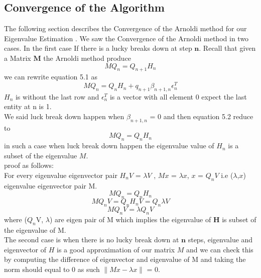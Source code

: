 \documentclass{article}
\numberwithin{equation}{section}
\begin{document}
\subsection{Convergence of the Algorithm} 
The following section describes the Convergence of the Arnoldi method for our Eigenvalue Estimation .
We saw the Convergence of the Arnoldi method in two cases.
In the first case If there is a lucky breaks down at step $\boldsymbol{n}$.
Recall that given a Matrix $\boldsymbol{M}$ the Arnoldi method produce 
\begin{equation}
     MQ_n = Q_{n+1}H_n 
\end{equation}
we can rewrite equation 5.1 as  
    \begin{equation}
     MQ_n = Q_nH_n +q_{n+1}\beta_{n+1,n} \epsilon_n^T   
\end{equation} ${H_n}$ is without the last row and ${\epsilon_n^T }$ is a vector with all element  0 expect the last entity at n is 1. \\
We said luck break down happen when ${\beta_{n+1,n}}$ = 0 and then equation 5.2 reduce to  
\begin{equation}
     MQ_n = Q_nH_n 
\end{equation} in such a case when luck break down happen the eigenvalue value of ${H_n}$ is a subset of the eigenvalue ${M}$.\\ proof as follows:\\
For every  eigenvalue eigenvector pair  ${H_n V}$ = ${\lambda V}$ , ${M x}$ = ${\lambda x}$, ${x}$ = ${Q_n V}$ i.e (${\lambda}$,${x}$) eigenvalue eigenvector pair M. \\
\begin{equation}
     MQ_n = Q_nH_n 
\end{equation}
\begin{equation}
     MQ_nV = Q_nH_nV = Q_n\lambda V  
\end{equation}
\begin{equation}
     MQ_nV = \lambda Q_n V 
\end{equation} 
where ($Q_n$V, $\lambda$) are  eigen pair of M which implies  the eigenvalue of $\boldsymbol{H}$ is subset of the eigenvalue of M.\\
 
The second case is when there is no lucky break down  at $\boldsymbol{n}$ steps, eigenvalue and eigenvector of ${H}$ is a good approximation of our matrix ${M}$ and we can check this by computing the difference of eigenvector and eigenvalue of M and taking the norm should equal to 0 as such  $\|Mx-\lambda x\|$ = 0.  
\end{document}
